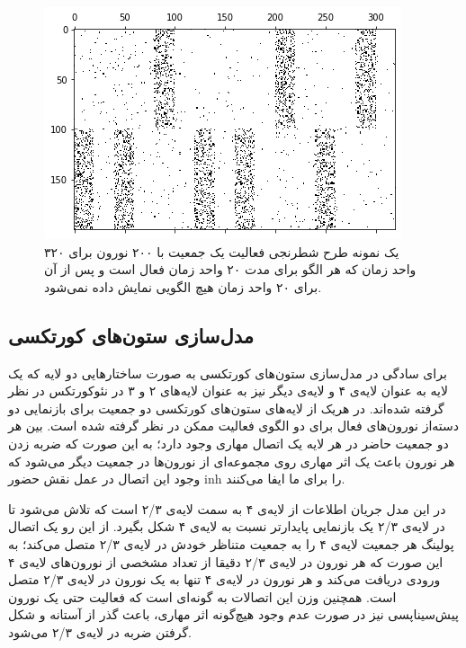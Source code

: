 \documentclass[12pt]{report}
\begin{document}
\begin{figure}[H]
	\centering
	\includegraphics[width=1.0\linewidth]{input-range.png}
	\caption[NS]{
		یک نمونه طرح شطرنجی فعالیت یک جمعیت با ۲۰۰ نورون برای ۳۲۰ واحد زمان که هر الگو برای مدت ۲۰ واحد زمان فعال است و پس از آن برای ۲۰ واحد زمان هیچ الگویی نمایش داده نمی‌شود.
	}
	\label{fig:input-range} 
\end{figure}
	
	\subsection{مدل‌سازی ستون‌های کورتکسی}
	
	برای سادگی در مدل‌سازی ستون‌های کورتکسی به صورت ساختارهایی دو لایه که یک لایه به عنوان لایه‌ی ۴ و لایه‌ی دیگر نیز به عنوان لایه‌‌های ۲ و ۳ در نئوکورتکس در نظر گرفته شده‌اند. در هریک از لایه‌های ستون‌های کورتکسی دو جمعیت برای بازنمایی دو دسته‌از نورون‌های فعال برای دو الگوی فعالیت ممکن در نظر گرفته شده است. بین هر دو جمعیت حاضر در هر لایه یک اتصال مهاری وجود دارد؛ به این صورت که ضربه زدن هر نورون باعث یک اثر مهاری روی مجموعه‌ای از نورون‌ها در جمعیت دیگر می‌شود که وجود این اتصال در عمل نقش حضور \gls{inh} را برای ما ایفا می‌کنند.
	
	در این مدل جریان اطلاعات از لایه‌ی ۴ به سمت لایه‌ی‌ ۲/۳ است که تلاش می‌شود تا در لایه‌ی ۲/۳ یک بازنمایی پایدار‌تر نسبت به لایه‌ی ۴ شکل بگیرد. از این رو یک اتصال پولینگ هر جمعیت لایه‌ی ۴ را به جمعیت متناظر خودش در لایه‌ی ۲/۳ متصل می‌کند؛ به این صورت که هر نورون در لایه‌ی ۲/۳ دقیقا از تعداد مشخصی از نورون‌های لایه‌ی ۴ ورودی دریافت می‌کند و هر نورون در لایه‌ی ۴ تنها به یک نورون در لایه‌ی ۲/۳ متصل است. همچنین وزن این اتصالات به گونه‌ای است که فعالیت حتی یک نورون پیش‌سیناپسی نیز در صورت عدم وجود هیچ‌گونه اثر مهاری، باعث گذر از آستانه و شکل گرفتن ضربه در لایه‌ی ۲/۳ می‌شود. 
	
\end{document}
